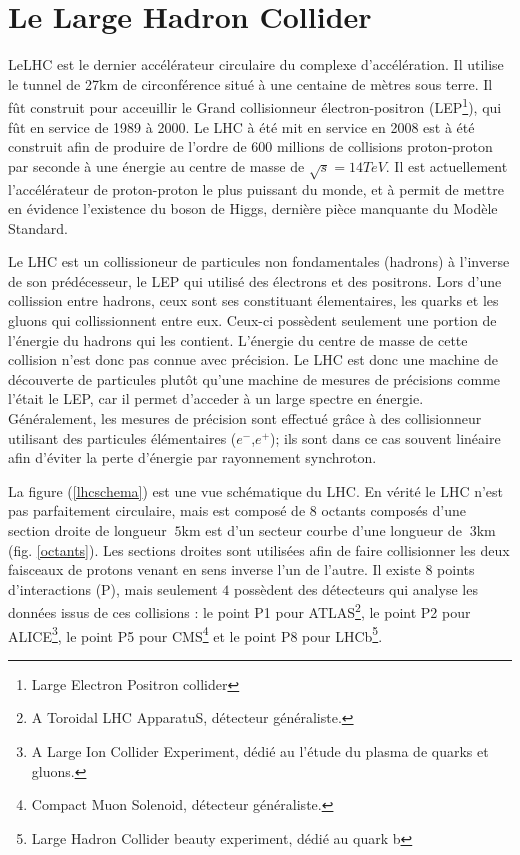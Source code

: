 \section{Le Large Hadron Collider}
LeLHC est le dernier accélérateur circulaire du complexe d'accélération. Il utilise le tunnel de 27km de circonférence situé à une centaine de mètres sous terre. Il fût construit pour acceuillir le Grand collisionneur électron-positron (LEP\footnote{Large Electron Positron collider}), qui fût en service de 1989 à 2000. Le LHC à été mit en service en 2008 est à été construit afin de produire de l'ordre de 600 millions de collisions proton-proton par seconde à une énergie au centre de masse de $\sqrt{s}=14 TeV$. Il est actuellement l'accélérateur de proton-proton le plus puissant du monde, et à permit de mettre en évidence l'existence du boson de Higgs, dernière pièce manquante du Modèle Standard.

Le LHC est un collissioneur de particules non fondamentales (hadrons) à l'inverse de son prédécesseur, le LEP qui utilisé des électrons et des positrons. Lors d'une collission entre hadrons, ceux sont ses constituant élementaires, les quarks et les gluons qui collissionnent entre eux. Ceux-ci possèdent seulement une portion de l'énergie du hadrons qui les contient. L'énergie du centre de masse de cette collision n'est donc pas connue avec précision. Le LHC est donc une machine de découverte de particules plutôt qu'une machine de mesures de précisions comme l'était le LEP, car il permet d'acceder à un large spectre en énergie. Généralement, les mesures de précision sont effectué grâce à des collisionneur utilisant des particules élémentaires ($e^{-}$,$e^{+}$); ils sont dans ce cas souvent linéaire afin d'éviter la perte d'énergie par rayonnement synchroton.

La figure (\ref{lhcschema}) est une vue schématique du LHC. En vérité le LHC n'est pas parfaitement circulaire, mais est composé de $8$ octants composés d'une section droite de longueur $~5$km est d'un secteur courbe d'une longueur de $~3$km (fig. \ref{octants}). Les sections droites sont utilisées afin de faire collisionner les deux faisceaux de protons venant en sens inverse l'un de l'autre. Il existe $8$ points d'interactions (P), mais seulement $4$ possèdent des détecteurs qui analyse les données issus de ces collisions : le point P1 pour ATLAS\footnote{A Toroidal LHC ApparatuS, détecteur généraliste.}, le point P2 pour ALICE\footnote{A Large Ion Collider Experiment, dédié au l'étude du plasma de quarks et gluons.}, le point P5 pour CMS\footnote{Compact Muon Solenoid, détecteur généraliste.} et le point P8 pour LHCb\footnote{Large Hadron Collider beauty experiment, dédié au quark b}.

